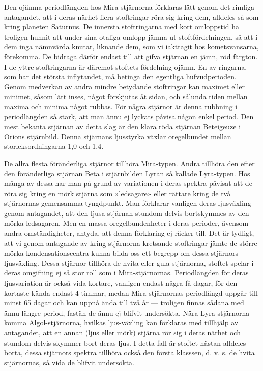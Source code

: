 \documentclass[a4paper, 12pt, oneside, swedish]{article}
\begin{document}
Den ojämna periodlängden hos Mira-stjärnorna förklaras lätt genom det rimliga antagandet, att i deras närhet flera stoftringar röra sig kring dem, alldeles så som kring planeten Saturnus. De innersta stoftringarna med kort omloppstid ha troligen hunnit att under sina otaliga omlopp jämna ut stoftfördelningen, så att i dem inga nämnvärda knutar, liknande dem, som vi iakttagit hos kometsvansarna, förekomma. De bidraga därför endast till att gifva stjärnan en jämn, röd färgton. I de yttre stoftringarna är däremot stoftets fördelning ojämn. En av ringarna, som har det största inflytandet, må betinga den egentliga hufvudperioden. Genom medverkan av andra mindre betydande stoftringar kan maximet eller minimet, såsom lätt inses, något förskjutas åt sidan, och sålunda tiden mellan maxima och minima något rubbas. För några stjärnor är denna rubbning i periodlängden så stark, att man ännu ej lyckats påvisa någon enkel period. Den mest bekanta stjärnan av detta slag är den klara röda stjärnan Beteigeuze i Orions stjärnbild. Denna stjärnans ljusstyrka växlar oregelbundet mellan storleksordningarna 1,0 och 1,4.

De allra flesta föränderliga stjärnor tillhöra Mira-typen. Andra tillhöra den efter den föränderliga stjärnan Beta i stjärnbilden Lyran så kallade Lyra-typen. Hos många av dessa har man på grund av variationen i deras spektra påvisat att de röra sig kring en mörk stjärna som »ledsagare» eller rättare kring de två stjärnornas gemensamma tyngdpunkt. Man förklarar vanligen deras ljusväxling genom antagandet, att den ljusa stjärnan stundom delvis bortskymmes av den mörka ledsagaren. Men en massa oregelbundenheter i deras perioder, ävensom andra omständigheter, antyda, att denna förklaring ej räcker till. Det är tydligt, att vi genom antagande av kring stjärnorna kretsande stoftringar jämte de större mörka kondensationscentra kunna bilda oss ett begrepp om dessa stjärnors ljusväxling. Dessa stjärnor tillhöra de hvita eller gula stjärnorna, stoftet spelar i deras omgifning ej så stor roll som i Mira-stjärnornas. Periodlängden för deras ljusvariation är också vida kortare, vanligen endast några få dagar, för den kortaste kända endast 4 timmar, medan Mira-stjärnornas periodlängd uppgår till minst 65 dagar och kan uppnå ända till två år --- troligen finnas sådana med ännu längre period, fastän de ännu ej blifvit undersökta. Nära Lyra-stjärnorna komma Algol-stjärnorna, hvilkas ljus-växling kan förklaras med tillhjälp av antagandet, att en annan (ljus eller mörk) stjärna rör sig i deras närhet och stundom delvis skymmer bort deras ljus. I detta fall är stoftet nästan alldeles borta, dessa stjärnors spektra tillhöra också den första klasssen, d. v. s. de hvita stjärnornas, så vida de blifvit undersökta.
\end{document}

